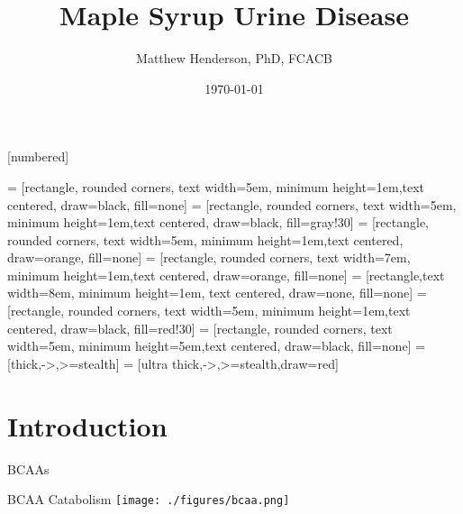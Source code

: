 \documentclass[presentation, smaller]{beamer}
\author{Matthew Henderson, PhD, FCACB}
\date{\today}
\title{Maple Syrup Urine Disease}
\institute[NSO]{Newborn Screening Ontario | The University of Ottawa}
\begin{document}
\maketitle

\vspace{220pt}
\beamertemplatenavigationsymbolsempty
{}[numbered]

 = [rectangle, rounded corners, text width=5em, minimum height=1em,text centered, draw=black, fill=none]
 = [rectangle, rounded corners, text width=5em, minimum height=1em,text centered, draw=black, fill=gray!30]
 = [rectangle, rounded corners, text width=5em, minimum height=1em,text centered, draw=orange, fill=none]
 = [rectangle, rounded corners, text width=7em, minimum height=1em,text centered, draw=orange, fill=none]
 = [rectangle,text width=8em, minimum height=1em, text centered, draw=none, fill=none]
 = [rectangle, rounded corners, text width=5em, minimum height=1em,text centered, draw=black, fill=red!30]
 = [rectangle, rounded corners, text width=5em, minimum height=5em,text centered, draw=black, fill=none]
 = [thick,->,>=stealth]
 = [ultra thick,->,>=stealth,draw=red]

\section{Introduction}
\label{sec:orgheadline3}
\begin{frame}[label={sec:orgheadline1}]{BCAAs}
\centering
{}
\end{frame}

\begin{frame}[label={sec:orgheadline2}]{BCAA Catabolism}
\centering
\texttt{[image: ./figures/bcaa.png]}
\end{frame}
\end{document}
